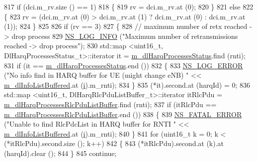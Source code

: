 \begin{DoxyCode}
817           \textcolor{keywordflow}{if} (dci.m\_rv.size () == 1)
818             \{
819               rv = dci.m\_rv.at (0);
820             \}
821           \textcolor{keywordflow}{else}
822             \{
823               rv = (dci.m\_rv.at (0) > dci.m\_rv.at (1) ? dci.m\_rv.at (0) : dci.m\_rv.at (1));
824             \}
825 
826           \textcolor{keywordflow}{if} (rv == 3)
827             \{
828               \textcolor{comment}{// maximum number of retx reached -> drop process}
829               \hyperlink{group__logging_gafbd73ee2cf9f26b319f49086d8e860fb}{NS\_LOG\_INFO} (\textcolor{stringliteral}{"Maximum number of retransmissions reached -> drop process"});
830               std::map <uint16\_t, DlHarqProcessesStatus\_t>::iterator it = 
      \hyperlink{classns3_1_1FdBetFfMacScheduler_a93d8bf3298e9b289d9fcf70571b27b78}{m\_dlHarqProcessesStatus}.find (rnti);
831               \textcolor{keywordflow}{if} (it == \hyperlink{classns3_1_1FdBetFfMacScheduler_a93d8bf3298e9b289d9fcf70571b27b78}{m\_dlHarqProcessesStatus}.end ())
832                 \{
833                   \hyperlink{group__logging_ga0261a8db1d4ac5f79417d117634fd455}{NS\_LOG\_ERROR} (\textcolor{stringliteral}{"No info find in HARQ buffer for UE (might change eNB) "} << 
      \hyperlink{classns3_1_1FdBetFfMacScheduler_ae987d949dcc264154314730346f4a7a8}{m\_dlInfoListBuffered}.at (\hyperlink{bernuolliDistribution_8m_a6f6ccfcf58b31cb6412107d9d5281426}{i}).m\_rnti);
834                 \}
835               (*it).second.at (harqId) = 0;
836               std::map <uint16\_t, DlHarqRlcPduListBuffer\_t>::iterator itRlcPdu =  
      \hyperlink{classns3_1_1FdBetFfMacScheduler_ace3cb887417444023ca2f39d5de6a7cf}{m\_dlHarqProcessesRlcPduListBuffer}.find (rnti);
837               \textcolor{keywordflow}{if} (itRlcPdu == \hyperlink{classns3_1_1FdBetFfMacScheduler_ace3cb887417444023ca2f39d5de6a7cf}{m\_dlHarqProcessesRlcPduListBuffer}.end ())
838                 \{
839                   \hyperlink{group__fatal_ga5131d5e3f75d7d4cbfd706ac456fdc85}{NS\_FATAL\_ERROR} (\textcolor{stringliteral}{"Unable to find RlcPdcList in HARQ buffer for RNTI "} << 
      \hyperlink{classns3_1_1FdBetFfMacScheduler_ae987d949dcc264154314730346f4a7a8}{m\_dlInfoListBuffered}.at (\hyperlink{bernuolliDistribution_8m_a6f6ccfcf58b31cb6412107d9d5281426}{i}).m\_rnti);
840                 \}
841               \textcolor{keywordflow}{for} (uint16\_t k = 0; k < (*itRlcPdu).second.size (); k++)
842                 \{
843                   (*itRlcPdu).second.at (k).at (harqId).clear ();
844                 \}
845               \textcolor{keywordflow}{continue};

\end{DoxyCode}
